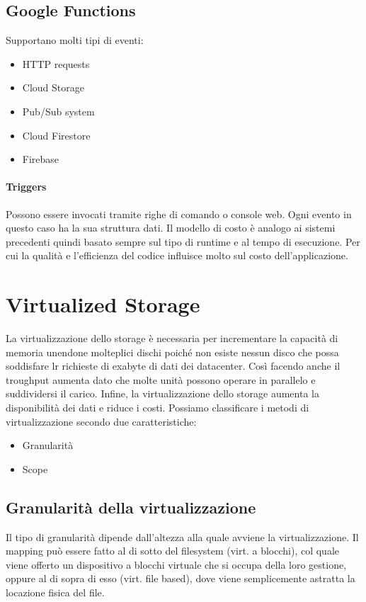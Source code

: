 \documentclass{article}
\begin{document}
		\subsection{Google Functions}
		Supportano molti tipi di eventi:
		\begin{itemize}
		    \item HTTP requests
		    \item Cloud Storage
		    \item Pub/Sub system
		    \item Cloud Firestore
		    \item Firebase
		\end{itemize}
		\paragraph{Triggers}
		Possono essere invocati tramite righe di comando o console web.
		Ogni evento in questo caso ha la sua struttura dati.
		Il modello di costo è analogo ai sistemi precedenti quindi basato sempre sul tipo di runtime e al tempo di esecuzione. Per cui la qualità e l'efficienza del codice influisce molto sul costo dell'applicazione. 
		
		\newpage
		\section{Virtualized Storage}
		La virtualizzazione dello storage è necessaria per incrementare la capacità di memoria unendone molteplici dischi poiché non esiste nessun disco che possa soddisfare lr richieste di exabyte di dati dei datacenter. Così facendo anche il troughput aumenta dato che molte unità possono operare in parallelo e suddividersi il carico. Infine, la virtualizzazione dello storage aumenta la disponibilità dei dati e riduce i costi.
		Possiamo classificare i metodi di virtualizzazione secondo due caratteristiche:
		\begin{itemize}
		\item Granularità 
		\item Scope
		\end{itemize}
		
		\subsection{Granularità della virtualizzazione}
		Il tipo di granularità dipende dall’altezza alla quale avviene la virtualizzazione. Il mapping può essere fatto al di sotto del filesystem (virt. a blocchi), col quale viene offerto un dispositivo a blocchi virtuale che si occupa della loro gestione, oppure al di sopra di esso (virt. file based), dove viene semplicemente astratta la locazione fisica del file.
		
\end{document}
